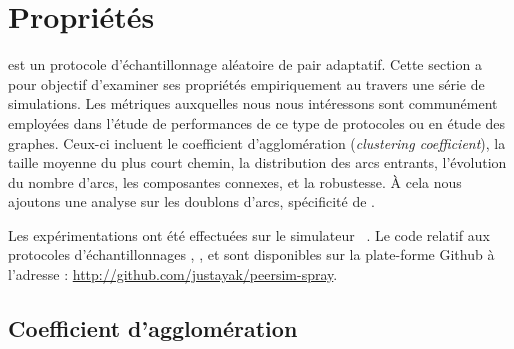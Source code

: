 
\section{Propriétés}
\label{net:sec:properties}

\SPRAY est un protocole d'échantillonnage aléatoire de pair adaptatif. Cette
section a pour objectif d'examiner ses propriétés empiriquement au travers une
série de simulations. Les métriques auxquelles nous nous intéressons sont
communément employées dans l'étude de performances de ce type de protocoles ou
en étude des graphes. Ceux-ci incluent le coefficient d'agglomération
(\emph{clustering coefficient}), la taille moyenne du plus court chemin, la
distribution des arcs entrants, l'évolution du nombre d'arcs, les composantes
connexes, et la robustesse. À cela nous ajoutons une analyse sur les doublons
d'arcs, spécificité de \SPRAY.


Les expérimentations ont été effectuées sur le simulateur
\PEERSIM~\cite{montresor2009peersim}. Le code relatif aux protocoles
d'échantillonnages \CYCLON, \SCAMP, et \SPRAY sont disponibles sur la
plate-forme Github à l'adresse : \url{http://github.com/justayak/peersim-spray}.

\subsection{Coefficient d'agglomération}
\label{net:subsec:clustering}

